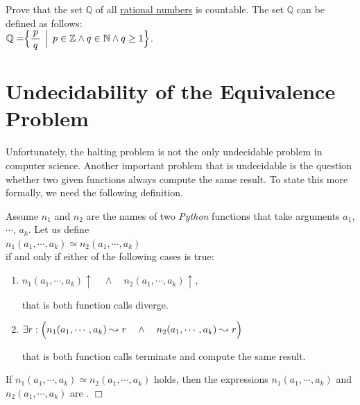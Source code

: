 \exerciseEng
Prove that the set $\mathbb{Q}$ of all \href{https://en.wikipedia.org/wiki/Rational_number}{rational numbers}
is countable.  The set $\mathbb{Q}$ can be defined as follows: 
\\[0.2cm]
\hspace*{1.3cm}
$\displaystyle \mathbb{Q} = \Bigr\{ \frac{\,p\,}{q} \,\Bigm|\, p \in \mathbb{Z} \wedge q \in \mathbb{N} \wedge q
\geq 1 \Bigr\}$.



\section[The Equivalence Problem]{Undecidability of the Equivalence Problem}
Unfortunately, the halting problem is not the only undecidable problem in computer science.  Another
important problem that is undecidable is the question whether two given functions always compute the
same result.  To state this more formally, we need the following definition.


\begin{Definition}[$\simeq$] 
Assume $n_1$ and $n_2$ are the names of two \textsl{Python} functions that take arguments
  $a_1$, $\cdots$, $a_k$.  Let us define \\[0.2cm]
\hspace*{1.3cm} 
$n_1(a_1,\cdots,a_k) \simeq n_2(a_1,\cdots,a_k)$ 
\\[0.2cm]
if and only if either of the following cases is true:
\begin{enumerate}
\item $n_1(a_1,\cdots,a_k)\uparrow \quad\wedge\quad n_2(a_1,\cdots,a_k)\uparrow$,

      that is both function calls diverge.
\item $\exists r: \Bigl(n_1(a_1,\cdots,a_k) \leadsto r \quad\wedge\quad n_2(a_1,\cdots,a_k) \leadsto
  r\Bigr)$

      that is both function calls terminate and compute the same result.
\end{enumerate}
If $n_1(a_1,\cdots,a_k) \simeq n_2(a_1,\cdots,a_k)$ holds, then the expressions $n_1(a_1,\cdots,a_k)$ and $n_2(a_1,\cdots,a_k)$ are 
. 
\hspace*{\fill} $\Box$
\end{Definition}

